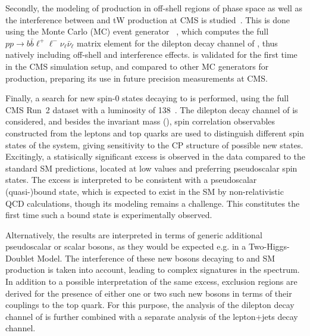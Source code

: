
Secondly, the modeling of \ttbar production in off-shell regions of phase space as well as the interference between \ttbar and tW production at CMS is studied~\cite{CMS:NOTE-2023-015}. This is done using the Monte Carlo (MC) event generator \bbfourl~\cite{Jezo:2016ujg}, which computes the full $p p \rightarrow b \bar{b} \ell^+ \ell^- \nu_{\ell} \bar{\nu}_{\ell}$ matrix element for the dilepton decay channel of \ttbar, thus natively including off-shell and interference effects. \bbfourl is validated for the first time in the CMS simulation setup, and compared to other MC generators for \ttbar production, preparing its use in future precision \ttbar measurements at CMS.


Finally, a search for new spin-0 states decaying to \ttbar is performed, using the full CMS Run~2 dataset with a luminosity of \SI{138}{\fbinv}~\cite{CMS:HIG-22-013-PAS,CMS:TOP-24-007}. The dilepton decay channel of \ttbar is considered, and besides the invariant \ttbar mass (\mtt), spin correlation observables constructed from the leptons and top quarks are used to distinguish different spin states of the \ttbar system, giving sensitivity to the CP structure of possible new states. Excitingly, a statisically significant excess is observed in the data compared to the standard SM predictions, located at low \mtt values and preferring pseudoscalar spin states. The excess is interpreted to be consistent with a pseudoscalar \ttbar (quasi-)bound state, which is expected to exist in the SM by non-relativistic QCD calculations, though its modeling remains a challenge. This constitutes the first time such a \ttbar bound state is experimentally observed.

Alternatively, the results are interpreted in terms of generic additional pseudoscalar or scalar bosons, as they would be expected e.g. in a Two-Higgs-Doublet Model. The interference of these new bosons decaying to \ttbar and SM \ttbar production is taken into account, leading to complex signatures in the \mtt spectrum. In addition to a possible interpretation of the same excess, exclusion regions are derived for the presence of either one or two such new bosons in terms of their couplings to the top quark. For this purpose, the analysis of the dilepton decay channel of \ttbar is further combined with a separate analysis of the lepton+jets decay channel.

